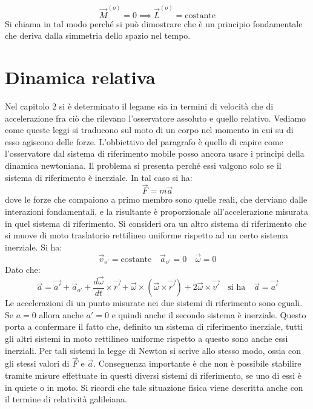 \documentclass[10pt,a4paper]{book}
\begin{document}
\[
	\boxed{\vec{M}^{(o)}=0 \implies \vec{L}^{(o)}= \text{costante}}
\]
Si chiama in tal modo perché si può dimostrare che è un principio fondamentale che deriva dalla simmetria dello spazio nel tempo.







































\section{Dinamica relativa}

Nel capitolo 2 si è determinato il legame sia in termini di velocità che di accelerazione fra ciò che rilevano l'osservatore assoluto e quello relativo. Vediamo come queste leggi si traducono sul moto di un corpo nel momento in cui su di esso agiscono delle forze. L'obbiettivo del paragrafo è quello di capire come l'osservatore dal sistema di riferimento mobile posso ancora usare i principi della dinamica newtoniana.
Il problema si presenta perché essi valgono solo se il sistema di riferimento è inerziale. In tal caso si ha:
\[
	\vec{F}=m\vec{a}
\]
dove le forze che compaiono a primo membro sono quelle reali, che derviano dalle interazioni fondamentali, e la risultante è proporzionale all'accelerazione misurata in quel sistema di riferimento. Si consideri ora un altro sistema di riferimento che si muove di moto traslatorio rettilineo uniforme rispetto ad un certo sistema inerziale. Si ha:
\[
	\vec{v}_{o'}=\text{costante} \quad \vec{a}_{o'}=0 \quad \vec{\omega}=0
\]
Dato che:
\[
	\vec{a}=\vec{a'}+\vec{a}_{o'}+\frac{d\vec{\omega}}{dt} \times \vec{r'}+\vec{\omega}\times (\vec{\omega} \times \vec{r'})+2\vec{\omega} \times \vec{v'} \quad \text{si ha} \quad \vec{a}=\vec{a'}
\]
Le accelerazioni di un punto misurate nei due sistemi di riferimento sono eguali. Se $a=0$ allora anche $a'=0$ e quindi anche il secondo sistema è inerziale. Questo porta a confermare il fatto che, definito un sistema di riferimento inerziale, tutti gli altri sistemi in moto rettilineo uniforme rispetto a questo sono anche essi inerziali. Per tali sistemi la legge di Newton si scrive allo stesso modo, ossia con gli stessi valori di $\vec{F}$ e $\vec{a}$. Conseguenza importante è che non è possibile stabilire tramite misure effettuate in questi diversi sistemi di riferimento, se uno di essi è in quiete o in moto. Si ricordi che tale situazione fisica viene descritta anche con il termine di relatività galileiana.
\end{document}
